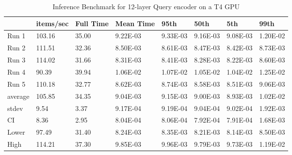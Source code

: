 \begin{table*}[!ht]
    \centering
    \begin{tabular}{|l|l|l|l|l|l|l|l|}
    \hline
        ~ & items/sec & Full Time & Mean Time & 95th & 50th & 5th & 99th \\ \hline
        Run 1 & 103.16 & 35.00 & 9.22E-03 & 9.33E-03 & 9.16E-03 & 9.08E-03 & 1.20E-02 \\ \hline
        Run 2 & 111.51 & 32.36 & 8.50E-03 & 8.61E-03 & 8.47E-03 & 8.42E-03 & 8.73E-03 \\ \hline
        Run 3 & 114.02 & 31.66 & 8.31E-03 & 8.41E-03 & 8.28E-03 & 8.22E-03 & 8.60E-03 \\ \hline
        Run 4 & 90.39 & 39.94 & 1.06E-02 & 1.07E-02 & 1.05E-02 & 1.04E-02 & 1.25E-02 \\ \hline
        Run 5 & 110.18 & 32.77 & 8.62E-03 & 8.74E-03 & 8.58E-03 & 8.51E-03 & 9.06E-03 \\ \hline
        average & 105.85 & 34.35 & 9.04E-03 & 9.15E-03 & 9.00E-03 & 8.93E-03 & 1.02E-02 \\ \hline
        stdev & 9.54 & 3.37 & 9.17E-04 & 9.19E-04 & 9.04E-04 & 9.02E-04 & 1.92E-03 \\ \hline
        CI & 8.36 & 2.95 & 8.04E-04 & 8.06E-04 & 7.92E-04 & 7.91E-04 & 1.68E-03 \\ \hline
        Lower & 97.49 & 31.40 & 8.24E-03 & 8.35E-03 & 8.21E-03 & 8.14E-03 & 8.50E-03 \\ \hline
        High & 114.21 & 37.30 & 9.85E-03 & 9.96E-03 & 9.79E-03 & 9.73E-03 & 1.19E-02 \\ \hline
    \end{tabular}
    \caption{Inference Benchmark for 12-layer Query encoder on a T4 GPU}
    \label{tab:benchmark-gpu-12layer}
\end{table*}

